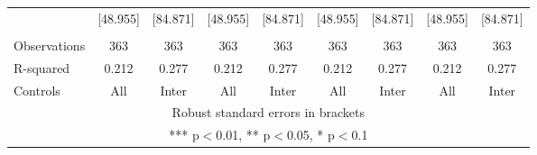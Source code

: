 \begin{tabular}{lcccccccc}
 & [48.955] & [84.871] & [48.955] & [84.871] & [48.955] & [84.871] & [48.955] & [84.871] \\
 &  &  &  &  &  &  &  &  \\
Observations & 363 & 363 & 363 & 363 & 363 & 363 & 363 & 363 \\
R-squared & 0.212 & 0.277 & 0.212 & 0.277 & 0.212 & 0.277 & 0.212 & 0.277 \\
 Controls & All & Inter & All & Inter & All & Inter & All & Inter \\ \hline
\multicolumn{9}{c}{ Robust standard errors in brackets} \\
\multicolumn{9}{c}{ *** p$<$0.01, ** p$<$0.05, * p$<$0.1} \\
\end{tabular}
